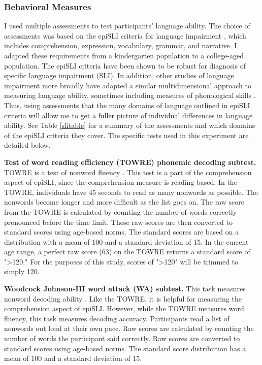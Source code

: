 \documentclass[../dissertation.tex]{subfiles}
\begin{document}
\subsubsection{Behavioral Measures}
	I used multiple assessments to test participants' language ability.  The choice of assessments was based on the epiSLI criteria for language impairment \citep{Tomblin1996}, which includes comprehension, expression, vocabulary, grammar, and narrative. I adapted these requirements from a kindergarten population to a college-aged population. The epiSLI criteria have been shown to be robust for diagnosis of specific language impairment (SLI). In addition, other studies of language impairment more broadly have adapted a similar multidimensional approach to measuring language ability, sometimes including measures of phonological skills \citep{Catts2006}. Thus, using assessments that the many domains of language outlined in epiSLI criteria will allow me to get a fuller picture of individual differences in language ability. See Table \ref{slitable} for a summary of the assessments and which domains of the epiSLI criteria they cover. The specific tests used in this experiment are detailed below. \par
	\textbf{Test of word reading efficiency (TOWRE) phonemic decoding subtest.} TOWRE is a test of nonword fluency \citep{Torgesen1992}. This test is a part of the comprehension aspect of epiSLI, since the comprehension measure is reading-based. In the TOWRE, individuals have 45 seconds to read as many nonwords as possible. The nonwords become longer and more difficult as the list goes on. The raw score from the TOWRE is calculated by counting the number of words correctly pronounced before the time limit. These raw scores are then converted to standard scores using age-based norms. The standard scores are based on a distribution with a mean of 100 and a standard deviation of 15. In the current age range, a perfect raw score (63) on the TOWRE returns a standard score of "\textgreater 120." For the purposes of this study, scores of "\textgreater 120" will be trimmed to simply 120. \par
	\textbf{Woodcock Johnson-III word attack (WA) subtest.} This task measures nonword decoding ability \citep{Woodcock2001}. Like the TOWRE, it is helpful for measuring the comprehension aspect of epiSLI. However, while the TOWRE measures word fluency, this task measures decoding accuracy. Participants read a list of nonwords out loud at their own pace. Raw scores are calculated by counting the number of words the participant said correctly. Raw scores are converted to standard scores using age-based norms. The standard score distribution has a mean of 100 and a standard deviation of 15. \par
\end{document}
